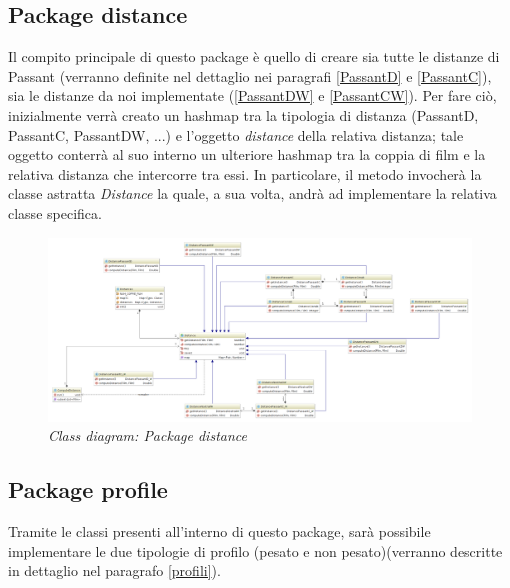 \subsection{Package distance}
\label{Package distance}
Il compito principale di questo package è quello di creare sia tutte le distanze di Passant (verranno definite nel dettaglio nei paragrafi \ref{PassantD} e \ref{PassantC}), sia le distanze da noi implementate (\ref{PassantDW} e \ref{PassantCW}). Per fare ciò, inizialmente verrà creato un hashmap tra la tipologia di distanza (PassantD, PassantC, PassantDW, ...) e l'oggetto \emph{distance} della relativa distanza; tale oggetto conterrà al suo interno un ulteriore hashmap tra la coppia di film e la relativa distanza che intercorre tra essi. In particolare, il metodo invocherà la classe astratta \emph{Distance} la quale, a sua volta, andrà ad implementare la relativa classe specifica.

\begin{figure}[H]
	\advance\leftskip-3cm
	\includegraphics[width=1.45\textwidth]{./images/Diagrams/distance.png}
	\caption{\emph{Class diagram: Package distance}}
\end{figure}

\subsection{Package profile}
Tramite le classi presenti all'interno di questo package, sarà possibile implementare le due tipologie di profilo (pesato e non pesato)(verranno descritte in dettaglio nel paragrafo \ref{profili}). 

